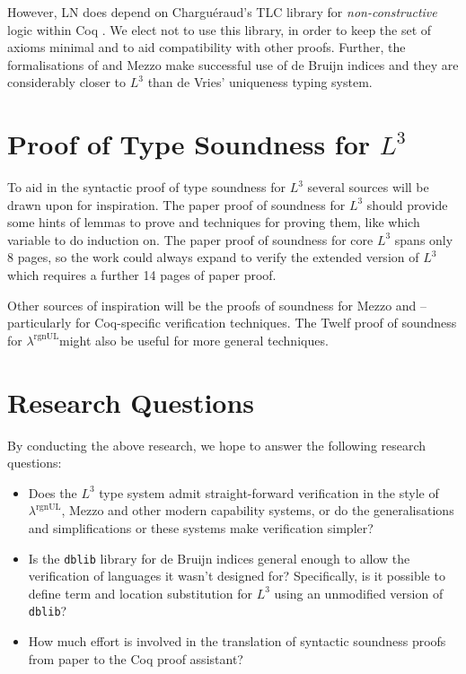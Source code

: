 \documentclass[]{unswthesis}
\newcommand{\rgnUL}{$\lambda^\text{rgnUL}$\text{ }}
\newcommand{\SSPHS}{\text{SSPHS }}
\begin{document}
However, LN does depend on Chargu\'{e}raud's TLC library for \textit{non-constructive} logic within Coq \cite{tlc15}. We elect not to use this library, in order to keep the set of axioms minimal and to aid compatibility with other proofs. Further, the formalisations of \SSPHS and Mezzo make successful use of de Bruijn indices and they are considerably closer to $L^3$ than de Vries' uniqueness typing system.

\section{Proof of Type Soundness for $L^3$}
\label{sec:proof_proposal}

To aid in the syntactic proof of type soundness for $L^3$ several sources will be drawn upon for inspiration. The paper proof of soundness for $L^3$ should provide some hints of lemmas to prove and techniques for proving them, like which variable to do induction on. The paper proof of soundness for core $L^3$ spans only 8 pages, so the work could always expand to verify the extended version of $L^3$ which requires a further 14 pages of paper proof.

Other sources of inspiration will be the proofs of soundness for Mezzo and \SSPHS -- particularly for Coq-specific verification techniques. The Twelf proof of soundness for \rgnUL might also be useful for more general techniques.

\section{Research Questions}
\label{sec:research_questions}

By conducting the above research, we hope to answer the following research questions:

\begin{itemize}
\item Does the $L^3$ type system admit straight-forward verification in the style of \rgnUL, Mezzo and other modern capability systems, or do the generalisations and simplifications or these systems make verification simpler?
\item Is the \texttt{dblib} library for de Bruijn indices general enough to allow the verification of languages it wasn't designed for? Specifically, is it possible to define term and location substitution for $L^3$ using an unmodified version of \texttt{dblib}?
\item How much effort is involved in the translation of syntactic soundness proofs from paper to the Coq proof assistant?
\end{itemize}
\end{document}
